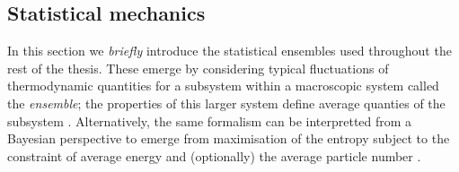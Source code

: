 \subsection{Statistical mechanics}
\label{sec:stat-mech}

In this section we \emph{briefly} introduce the statistical ensembles used throughout the rest of the thesis.
These emerge by considering typical fluctuations of thermodynamic quantities for a subsystem within a macroscopic system called the \emph{ensemble}; the properties of this larger system define average quanties of the subsystem \cite{Landau2008}.
Alternatively, the same formalism can be interpretted from a Bayesian perspective to emerge from maximisation of the entropy%
subject to the constraint of average energy and (optionally) the average particle number \cite{JaynesPR1957,JaynesPR1957a}.

